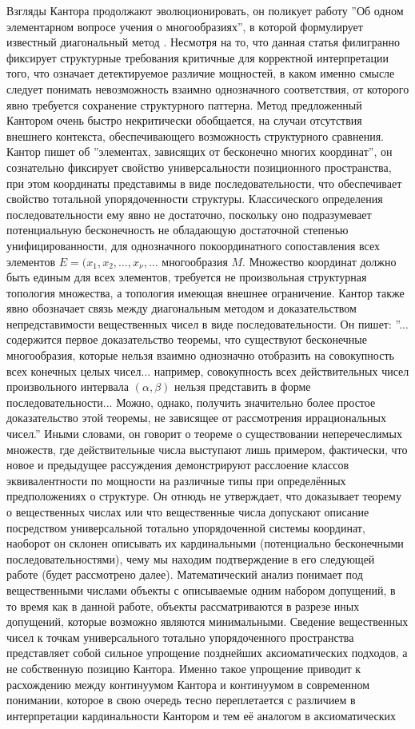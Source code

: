 \documentclass[12pt]{article}
\begin{document}
Взгляды Кантора продолжают эволюционировать, он поликует работу ''Об одном элементарном вопросе учения о многообразиях'', в которой формулирует известный диагональный метод \cite{cantor-diagonal}. Несмотря на то, что данная статья филигранно фиксирует структурные требования критичные для корректной интерпретации того, что означает детектируемое различие мощностей, в каком именно смысле следует понимать невозможность взаимно однозначного соответствия, от которого явно требуется сохранение структурного паттерна. Метод предложенный Кантором очень быстро некритически обобщается, на случаи отсутствия внешнего контекста, обеспечивающего возможность структурного сравнения. Кантор пишет об ''элементах, зависящих от бесконечно многих координат'', он сознательно фиксирует свойство универсальности позиционного пространства, при этом координаты представимы в виде последовательности, что обеспечивает свойство тотальной упорядоченности структуры. Классического определения последовательности ему явно не достаточно, поскольку оно подразумевает потенциальную бесконечность не обладающую достаточной степенью унифицированности, для однозначного покоординатного сопоставления всех элементов $E = (x_1, x_2, \dots, x_{\nu}, \dots$ многообразия $M$. Множество координат должно быть единым для всех элементов, требуется не произвольная структурная топология множества, а топология имеющая внешнее ограничение. Кантор также явно обозначает связь между диагональным методом и доказательством непредставимости вещественных чисел в виде последовательности. Он пишет: ''... содержится первое доказательство теоремы, что существуют бесконечные многообразия, которые нельзя взаимно однозначно отобразить на совокупность всех конечных целых чисел... например, совокупность всех действительных чисел произвольного интервала $(\alpha, \beta)$ нельзя представить в форме последовательности... Можно, однако, получить значительно более простое доказательство этой теоремы, не зависящее от рассмотрения иррациональных чисел.'' Иными словами, он говорит о теореме о существовании неперечеслимых множеств, где действительные числа выступают лишь примером, фактически, что новое и предыдущее рассуждения демонстрируют расслоение классов эквивалентности по мощности на различные типы при определённых предположениях о структуре. Он отнюдь не утверждает, что доказывает теорему о вещественных числах или что вещественные числа допускают описание посредством универсальной тотально упорядоченной системы координат, наоборот он склонен описывать их кардинальными (потенциально бесконечными последовательностями), чему мы находим подтверждение в его следующей работе (будет рассмотрено далее). Математический анализ понимает под вещественными числами объекты с описываемые одним набором допущений, в то время как в данной работе, объекты рассматриваются в разрезе иных допущений, которые возможно являются минимальными. Сведение вещественных чисел к точкам универсального тотально упорядоченного пространства представляет собой сильное упрощение позднейших аксиоматических подходов, а не собственную позицию Кантора. Именно такое упрощение приводит к расхождению между континуумом Кантора и континуумом в современном понимании, которое в свою очередь тесно переплетается с различием в интерпретации кардинальности Кантором и тем её аналогом в аксиоматических 
\end{document}
